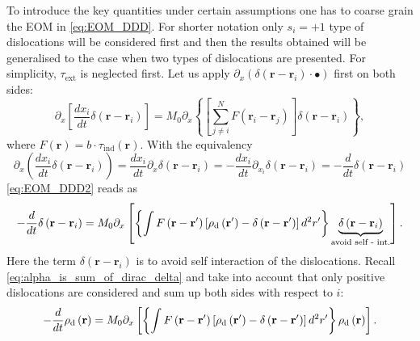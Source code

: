 To introduce the key quantities under certain assumptions one has to coarse grain the EOM in \cref{eq:EOM_DDD}. For shorter notation only $s_i=+1$ type of dislocations will be considered first and then the results obtained will be generalised to the case when two types of dislocations are presented. For simplicity, ${\tau _{{\text{ext}}}}$ is neglected first. Let us apply ${\partial _x}\left( {\delta \left( {{\mathbf{r}} - {{\mathbf{r}}_i}} \right) \cdot  \bullet } \right)$ first on both sides:
\begin{equation} \label{eq:EOM_DDD2}
{\partial _x}\left[ {\frac{{d{x_i}}}{{dt}}\delta \left( {{\mathbf{r}} - {{\mathbf{r}}_i}} \right)} \right] = {M_0}{\partial _x}\left\{ {\left[ {\sum\limits_{j \ne i}^N {F\left( {{{\mathbf{r}}_i} - {{\mathbf{r}}_j}} \right)} } \right]\delta \left( {{\mathbf{r}} - {{\mathbf{r}}_i}} \right)} \right\},
\end{equation}
where $F\left( {\mathbf{r}} \right) = b \cdot {\tau _{{\text{ind}}}}\left( {\mathbf{r}} \right)$. With the equivalency
\begin{equation}
{\partial _x}\left( {\frac{{d{x_i}}}{{dt}}\delta \left( {{\mathbf{r}} - {{\mathbf{r}}_i}} \right)} \right) = \frac{{d{x_i}}}{{dt}}{\partial _x}\delta \left( {{\mathbf{r}} - {{\mathbf{r}}_i}} \right) =  - \frac{{d{x_i}}}{{dt}}{\partial _{{x_i}}}\delta \left( {{\mathbf{r}} - {{\mathbf{r}}_i}} \right) =  - \frac{d}{{dt}}\delta \left( {{\mathbf{r}} - {{\mathbf{r}}_i}} \right)
\end{equation}
\cref{eq:EOM_DDD2} reads as
\begin{equation}
 - \frac{d}{{dt}}\delta \left( {{\mathbf{r}} - {{\mathbf{r}}_i}} \right) = {M_0}{\partial _x}\left[ {\left\{ {\int {F\left( {{\mathbf{r}} - {\mathbf{r}}'} \right)} \left[ {{\rho _{\rm{d}}}\left( {{\mathbf{r}}'} \right) - \delta \left( {{\mathbf{r}} - {\mathbf{r}}'} \right)} \right]{d^2}r'} \right\}\underbrace {\delta \left( {{\mathbf{r}} - {{\mathbf{r}}_i}} \right)}_{{\text{avoid self - int}}{\text{.}}}} \right].
\end{equation}
Here the term ${\delta \left( {{\mathbf{r}} - {{\mathbf{r}}_i}} \right)}$ is to avoid self interaction of the dislocations. Recall \cref{eq:alpha_is_sum_of_dirac_delta} and take into account that only positive dislocations are considered and sum up both sides with respect to $i$:
\begin{equation}
 - \frac{d}{{dt}}{\rho _{\rm{d}}}\left( {\mathbf{r}} \right) = {M_0}{\partial _x}\left[ {\left\{ {\int {F\left( {{\mathbf{r}} - {\mathbf{r}}'} \right)} \left[ {{\rho _{\rm{d}}}\left( {{\mathbf{r}}'} \right) - \delta \left( {{\mathbf{r}} - {\mathbf{r}}'} \right)} \right]{d^2}r'} \right\}{\rho _{\rm{d}}}\left( {\mathbf{r}} \right)} \right].
\end{equation}
